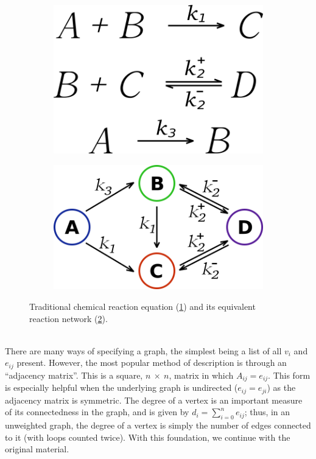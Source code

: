\documentclass[11pt]{article}
\begin{document}
\begin{figure}[h!]
  \centering
  \begin{subfigure}{.5\textwidth}
    \centering
    \includegraphics[width=.4\linewidth]{rxnSchematic}
    \caption{}
    \label{fig:rxnSchematic}
  \end{subfigure}%
  \begin{subfigure}{.5\textwidth}
    \centering
    \includegraphics[width=.8\linewidth]{rxnNetwork}
    \caption{}
    \label{fig:rxnNetwork}
  \end{subfigure}%
  \caption{Traditional chemical reaction equation (\ref{fig:rxnSchematic}) and its equivalent reaction network (\ref{fig:rxnNetwork}).}
  \label{fig:rxn}
\end{figure}
\\
There are many ways of specifying a graph, the simplest being a list of all $v_{i}$ and $e_{ij}$ present. However, the most popular method of description is through an ``adjacency matrix''. This is a square, $n \ \times \ n$, matrix in which $A_{ij}=e_{ij}$. This form is especially helpful when the underlying graph is undirected ($e_{ij}=e_{ji}$) as the adjacency matrix is symmetric. The degree of a vertex is an important measure of its connectedness in the graph, and is given by $d_{i}=\sum\limits_{i=0}^n e_{ij}$; thus, in an unweighted graph, the degree of a vertex is simply the number of edges connected to it (with loops counted twice). With this foundation, we continue with the original material.
\end{document}
